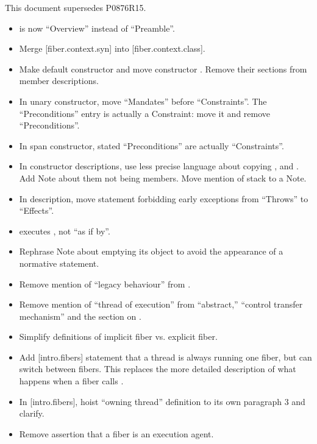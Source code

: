 \label{history}
This document supersedes P0876R15.


\begin{itemize}
    \item {} is now ``Overview'' instead of ``Preamble''.
    \item Merge [fiber.context.syn] into [fiber.context.class].
    \item Make default \fiber constructor and move constructor .
          Remove their sections from member descriptions.
    \item In unary constructor, move ``Mandates'' before ``Constraints''. The
          ``Preconditions'' entry is actually a Constraint: move it and remove
          ``Preconditions''.
    \item In span constructor, stated ``Preconditions'' are actually ``Constraints''.
    \item In constructor descriptions, use less precise language about copying
          ,  and . Add Note about them not
          being \fiber members. Move mention of stack to a Note.
    \item In \resumewith description, move statement forbidding early
          exceptions from ``Throws'' to ``Effects''.
    \item \resumewith executes \resume[continuation], not ``as if by''.
    \item Rephrase \resumewith Note about emptying its \fiber object to avoid
          the appearance of a normative statement.
    \item Remove mention of ``legacy behaviour'' from
          .
    \item Remove mention of ``thread of execution'' from ``abstract,''
          ``control transfer mechanism'' and the section on \exfns.
    \item Simplify definitions of implicit fiber vs. explicit fiber.
    \item Add [intro.fibers] statement that a thread is always running one
          fiber, but can switch between fibers. This replaces the more
          detailed description of what happens when a fiber calls \anyresume.
    \item In [intro.fibers], hoist ``owning thread'' definition to its own
          paragraph 3 and clarify.
    \item Remove assertion that a fiber is an execution agent.

\end{itemize}
